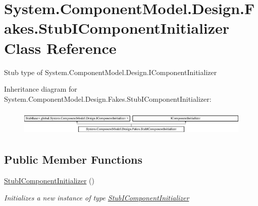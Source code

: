 \hypertarget{class_system_1_1_component_model_1_1_design_1_1_fakes_1_1_stub_i_component_initializer}{\section{System.\-Component\-Model.\-Design.\-Fakes.\-Stub\-I\-Component\-Initializer Class Reference}
\label{class_system_1_1_component_model_1_1_design_1_1_fakes_1_1_stub_i_component_initializer}
}


Stub type of System.\-Component\-Model.\-Design.\-I\-Component\-Initializer 


Inheritance diagram for System.\-Component\-Model.\-Design.\-Fakes.\-Stub\-I\-Component\-Initializer\-:\begin{figure}[H]
\begin{center}
\leavevmode
\includegraphics[height=1.272727cm]{class_system_1_1_component_model_1_1_design_1_1_fakes_1_1_stub_i_component_initializer}
\end{center}
\end{figure}
\subsection*{Public Member Functions}
\begin{DoxyCompactItemize}
\item 
\hyperlink{class_system_1_1_component_model_1_1_design_1_1_fakes_1_1_stub_i_component_initializer_a6e80173e6954c251ca9d3f8db34e5fa2}{Stub\-I\-Component\-Initializer} ()
\begin{DoxyCompactList}\small\item\em Initializes a new instance of type \hyperlink{class_system_1_1_component_model_1_1_design_1_1_fakes_1_1_stub_i_component_initializer}{Stub\-I\-Component\-Initializer}\end{DoxyCompactList}\end{DoxyCompactItemize}
